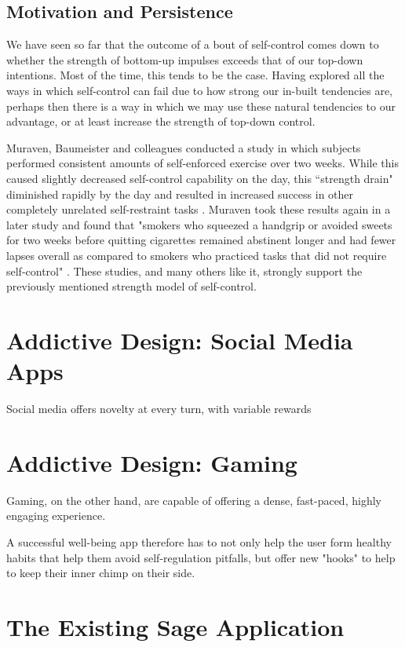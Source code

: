 \subsection{Motivation and Persistence}
We have seen so far that the outcome of a bout of self-control comes down to whether the strength of bottom-up impulses exceeds that of our top-down intentions. Most of the time, this tends to be the case. Having explored all the ways in which self-control can fail due to how strong our in-built tendencies are, perhaps then there is a way in which we may use these natural tendencies to our advantage, or at least increase the strength of top-down control.

Muraven, Baumeister and colleagues conducted a study in which subjects performed consistent amounts of self-enforced exercise over two weeks. While this caused slightly decreased self-control capability on the day, this ``strength drain" diminished rapidly by the day and resulted in increased success in other completely unrelated self-restraint tasks \cite{muraven1999longitudinal}. Muraven took these results again in a later study and found that "smokers who squeezed a handgrip or avoided sweets for two weeks before quitting cigarettes remained abstinent longer and had fewer lapses overall as compared to smokers who practiced tasks that did not require self-control" \cite{muraven2010practicing}. These studies, and many others like it, strongly support the previously mentioned strength model of self-control.


\section{Addictive Design: Social Media Apps}
Social media offers novelty at every turn, with variable rewards

\section{Addictive Design: Gaming}
Gaming, on the other hand, are capable of offering a dense, fast-paced, highly engaging experience.

A successful well-being app therefore has to not only help the user form healthy habits that help them avoid self-regulation pitfalls, but offer new "hooks" to help to keep their inner chimp on their side.

\section{The Existing Sage Application}

